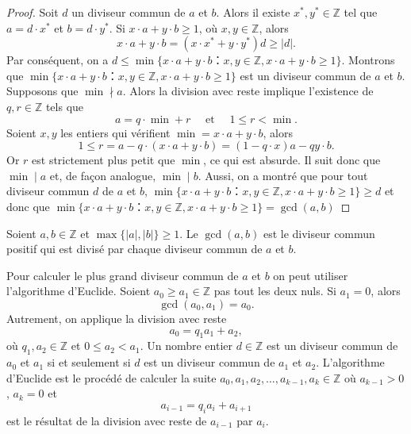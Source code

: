 \begin{proof}
  Soit $d$ un diviseur commun de $a$ et $b$. Alors il existe $x^*, y^* ∈ℤ$ tel que $a = d⋅x^*$ et $b = d ⋅y^*$. Si $x ⋅a + y ⋅ b≥1$, où $x,y ∈ℤ$, alors
  \begin{displaymath}
    x ⋅a + y ⋅ b = (x ⋅x^* + y ⋅ y^*)  d ≥ |d|. 
  \end{displaymath}
  Par conséquent, on a  $d \le \min\{ x ⋅a + y ⋅ b： x,y ∈ℤ,  x ⋅a + y ⋅ b≥1\}$.
 Montrons que $\min\{ x ⋅a + y ⋅ b： x,y ∈ℤ,  x ⋅a + y ⋅ b≥1\}$ est un diviseur commun de $a$ et $b$. Supposons que $\min \nmid a$. Alors
 la  division avec reste implique l'existence de $q,r ∈ℤ$ tels que  
  \begin{displaymath}
    a = q ⋅ \min + r \quad \text{ et } \quad 1 \leq r < \min.
  \end{displaymath}
  Soient $x,y$ les entiers qui vérifient $\min = x ⋅a + y ⋅b$, alors
  \begin{displaymath}
    1 ≤ r = a - q ⋅ (x ⋅a + y ⋅b) = (1-q⋅x) a - qy ⋅b.
  \end{displaymath}
  Or $r$ est strictement plus petit que $\min$, ce qui est absurde. Il suit donc que $\min \mid a$ et, de façon analogue, $\min \mid b$.
  Aussi, on a montré que pour tout diviseur commun $d$ de $a$ et $b$, $\min\{ x ⋅a + y ⋅ b： x,y ∈ℤ,  x ⋅a + y ⋅ b≥1\}\geq d$ et donc que $\min\{ x ⋅a + y ⋅ b： x,y ∈ℤ,  x ⋅a + y ⋅ b≥1\}= \gcd(a,b)$
  
\end{proof}



\begin{corollary}
  \label{co:5}
  Soient $a,b ∈ℤ$ et $\max\{|a|,|b|\} ≥1$. Le $\gcd(a,b)$ est le diviseur commun  positif qui est divisé par chaque diviseur commun de $a$ et $b$. 
\end{corollary}

Pour calculer le plus grand diviseur commun de $a$ et $b$ on peut utiliser l'algorithme d'Euclide. Soient $a_0≥a_1 ∈ℤ$ pas tout les deux nuls. Si $a_1 = 0$, alors
\begin{displaymath}
\gcd(a_0,a_1) =   a_0. 
\end{displaymath}
Autrement, on applique la division avec reste
\begin{displaymath}
  a_0 = q_1 a_1 + a_2, 
\end{displaymath}
où $q_1,a_2 ∈ℤ$ et $0 ≤ a_2<a_1$. Un nombre entier $d ∈ℤ$ est un diviseur commun de $a_0$ et $a_1$ si et seulement si $d$ est un diviseur commun de $a_1$ et $a_2$. L'algorithme d'Euclide est le procédé de calculer la suite $a_0,a_1,a_2,\dots,a_{k-1},a_k ∈ℤ$  où $a_{k-1}>0$, $a_k=0$ et 
\begin{displaymath}
  a_{i-1} = q_i a_i + a_{i+1} 
\end{displaymath}
est le résultat de la division avec reste de $a_{i-1} $ par $a_i$. 

